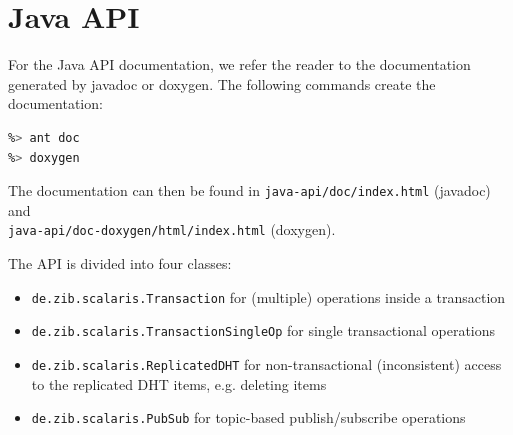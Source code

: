 \documentclass[a4paper]{scrreprt}
\newcommand{\code}[1]{\lstinline[basicstyle=\ttfamily]!#1!}
\begin{document}

\chapter{Java API}

For the Java API documentation, we refer the reader to the documentation
generated by javadoc or doxygen. The following commands create the
documentation:

\begin{lstlisting}[language=sh]
%> cd java-api
%> ant doc
%> doxygen
\end{lstlisting}

The documentation can then be found in \code{java-api/doc/index.html}
(javadoc) and\\ \code{java-api/doc-doxygen/html/index.html} (doxygen).

The API is divided into four classes:

\begin{itemize}
\item \code{de.zib.scalaris.Transaction} for (multiple) operations inside a
       transaction
\item \code{de.zib.scalaris.TransactionSingleOp} for single transactional
       operations
\item \code{de.zib.scalaris.ReplicatedDHT} for non-transactional (inconsistent)
       access to the replicated DHT items, e.g. deleting items
\item \code{de.zib.scalaris.PubSub} for topic-based publish/subscribe
       operations
\end{itemize}


\end{document}
